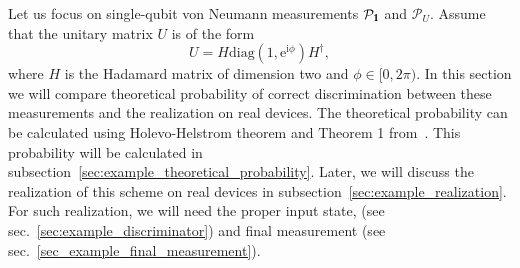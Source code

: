 \documentclass[preprint,12pt, a4paper]{elsarticle}
\newcommand{\1}{{\rm 1\hspace{-0.9mm}l}}
\newcommand{\ee}{\ensuremath{\mathrm{e}}}
\newcommand{\ii}{\ensuremath{\mathrm{i}}}
\newcommand{\PP}{\mathcal{P}}
\newcommand{\diag}{\mathrm{diag}}
\begin{document}
Let us focus on single-qubit von Neumann measurements $\PP_\1$ and $\PP_U$.
Assume that the unitary matrix $U$ is of the form 
\begin{equation}
U = H \diag (1, \ee^{\ii \phi}) H^\dagger,
\end{equation}
where $H$ is the Hadamard matrix of dimension two and $\phi \in [0, 2 \pi)$.
In this section we will compare theoretical probability of correct 
discrimination between these measurements and the realization on real devices.
The theoretical probability can be calculated using Holevo-Helstrom theorem and 
Theorem 1 from~\cite{puchala2018strategies}. 
This probability will be calculated in 
subsection~\ref{sec:example_theoretical_probability}. Later, we will 
discuss the realization of this scheme on real devices in 
subsection~\ref{sec:example_realization}. For such realization, we 
will need the proper input state, (see sec.~\ref{sec:example_discriminator}) 
and final measurement (see sec.~\ref{sec_example_final_measurement}). 
\end{document}
